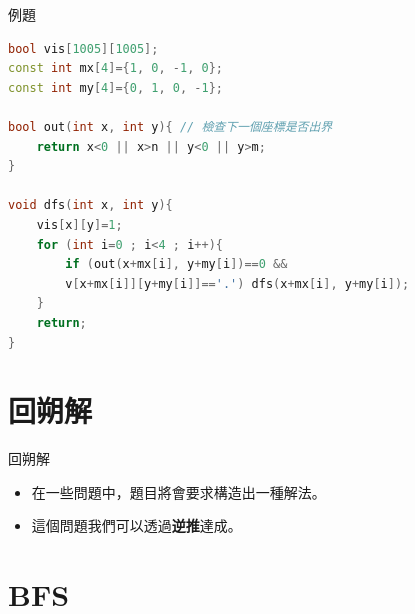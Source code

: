\documentclass[mathserif]{beamer}
\begin{document}
\begin{frame}[fragile]{例題}
\begin{lstlisting}[language=C++, caption={}]
bool vis[1005][1005];
const int mx[4]={1, 0, -1, 0};
const int my[4]={0, 1, 0, -1};

bool out(int x, int y){ // 檢查下一個座標是否出界
    return x<0 || x>n || y<0 || y>m;
}

void dfs(int x, int y){
    vis[x][y]=1;
    for (int i=0 ; i<4 ; i++){
        if (out(x+mx[i], y+my[i])==0 &&
        v[x+mx[i]][y+my[i]]=='.') dfs(x+mx[i], y+my[i]);
    }
    return;
}
\end{lstlisting}
\end{frame}

\section{回朔解}

\begin{frame}{回朔解}
    \begin{itemize}
        \item 在一些問題中，題目將會要求構造出一種解法。
        \item 這個問題我們可以透過\textbf{逆推}達成。
    \end{itemize}

\end{frame}

\section{BFS}
\end{document}
